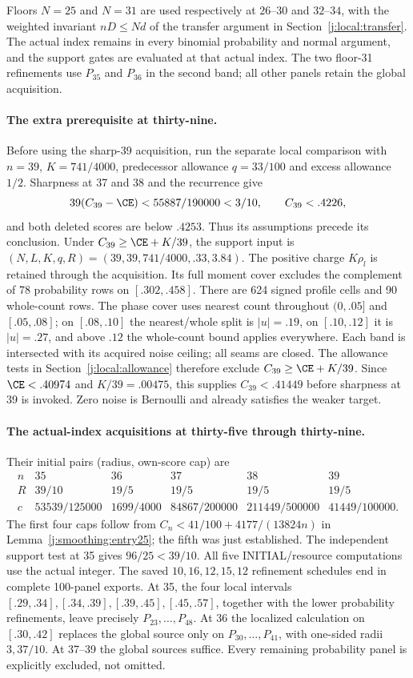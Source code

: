 Floors $N=25$ and $N=31$ are used respectively at $26$--$30$ and
$32$--$34$, with the weighted invariant $nD\le Nd$ of
the transfer argument in Section~\ref{j:local:transfer}. The actual index remains in every binomial
probability and normal argument, and the support gates are evaluated at
that actual index. The two floor-31 refinements use $P_{35}$ and $P_{36}$
in the second band; all other panels retain the global acquisition.

\paragraph{The extra prerequisite at thirty-nine.}
Before using the sharp-39 acquisition, run the separate local comparison
with $n=39$, $K=741/4000$, predecessor allowance $q=33/100$ and
excess allowance $1/2$. Sharpness at 37 and 38 and the recurrence give
\[
39(C_{39}-\CE)<55887/190000<3/10,\qquad C_{39}<.4226,
\]
and both deleted scores are below $.4253$. Thus its assumptions precede
its conclusion. Under $C_{39}\ge\CE+K/39$, the support input is
$(N,L,K,q,R)=(39,39,741/4000,.33,3.84)$.
The positive charge $K\rho_l$ is retained through the acquisition.
Its full moment cover excludes the complement of 78 probability rows on
$[.302,.458]$. There are 624 signed profile cells and 90 whole-count rows.
The phase cover uses nearest count throughout $(0,.05]$ and $[.05,.08]$;
on $[.08,.10]$ the nearest/whole split is $|u|=.19$, on $[.10,.12]$
it is $|u|=.27$, and above $.12$ the whole-count bound applies everywhere.
Each band is intersected with its acquired noise ceiling; all seams are
closed. The allowance tests in Section~\ref{j:local:allowance} therefore
exclude $C_{39}\ge\CE+K/39$. Since $\CE<.40974$ and
$K/39=.00475$, this supplies $C_{39}<.41449$ before sharpness at 39
is invoked. Zero noise is Bernoulli and already satisfies the weaker target.

\paragraph{The actual-index acquisitions at thirty-five through thirty-nine.}
Their initial pairs (radius, own-score cap) are
\[
\begin{array}{c|ccccc}
n&35&36&37&38&39\\\hline
R&39/10&19/5&19/5&19/5&19/5\\
c&53539/125000&1699/4000&84867/200000&211449/500000&41449/100000.
\end{array}
\]
The first four caps follow from $C_n<41/100+4177/(13824n)$ in
Lemma~\ref{j:smoothing:entry25}; the fifth was just established.
The independent support test at 35 gives $96/25<39/10$.
All five INITIAL/resource computations use the actual integer.
The saved $10,16,12,15,12$ refinement schedules end in complete
100-panel exports. At 35, the four local intervals
$[.29,.34],[.34,.39],[.39,.45],[.45,.57]$, together with the lower
probability refinements, leave precisely $P_{23},\ldots,P_{48}$.
At 36 the localized calculation on $[.30,.42]$ replaces the global
source only on $P_{30},\ldots,P_{41}$, with one-sided radii $3,37/10$.
At 37--39 the global sources suffice. Every remaining probability
panel is explicitly excluded, not omitted.

